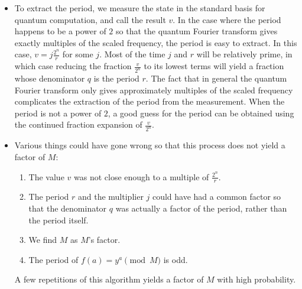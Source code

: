 \documentclass{article}
\def\pagedone{\newpage}
\begin{document}
\begin{itemize}
\item To extract the period, we measure the state in the standard basis for quantum computation, 
and call the result $v$.  In the case 
where the period happens to be a power of $2$ so that
the quantum Fourier transform gives exactly multiples of the scaled 
frequency, the period is easy to extract. In this case,
$v=j\frac{2^n}{r}$ for some $j$. Most of the time $j$ and $r$ will
be relatively prime, in which case reducing the fraction $\frac{v}{2^n}$
to its lowest terms will yield a fraction whose denominator $q$
is the period $r$. The fact that in general the quantum Fourier
transform only gives approximately multiples of the scaled
frequency complicates the extraction of the period from the
measurement. When the period is not a power of $2$, a good guess for
the period can be obtained using the continued fraction expansion of
$\frac{v}{2^n}$.
 \item Various things could have gone wrong so that this process does 
not yield a factor of $M$:
\begin{enumerate}
\item The value $v$ was not close enough to a multiple of $\frac{2^n}{r}$.
\item The period $r$ and the multiplier $j$ could have had a common factor
so that the denominator $q$ was actually a factor of the period, rather than the 
period itself.
\item We find $M$ as $M$'s factor.
\item The period of $f(a) = y^a \pmod M$ is odd.
\end{enumerate}
A few repetitions of this algorithm yields a factor of $M$ with
high probability.

\end{itemize}
\pagedone
\end{document}
